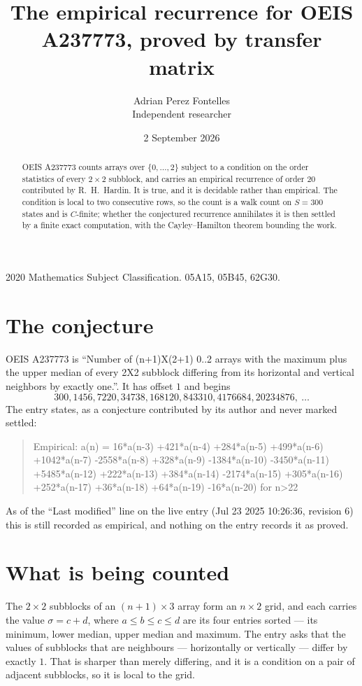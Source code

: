 \documentclass[11pt,a4paper]{article}
\title{The empirical recurrence for OEIS A237773, proved by transfer matrix}
\author{Adrian Perez Fontelles\\ \small Independent researcher}
\date{2 September 2026}
\theoremstyle{plain}
\theoremstyle{definition}
\begin{document}
\maketitle

\begin{abstract}
OEIS A237773 counts arrays over $\{0,\dots,2\}$ subject to a condition on the order
statistics of every $2\times2$ subblock, and carries an empirical recurrence of order
$20$ contributed by R.~H.~Hardin. It is true, and it is decidable rather than empirical.
The condition is local to two consecutive rows, so the count is a walk count on $S=300$
states and is $C$-finite; whether the conjectured recurrence annihilates it is then settled by
a finite exact computation, with the Cayley--Hamilton theorem bounding the work.
\end{abstract}

\noindent\small 2020 Mathematics Subject Classification. 05A15, 05B45, 62G30.\normalsize

\section{The conjecture}

OEIS A237773 is ``Number of (n+1)X(2+1) 0..2 arrays with the maximum plus the upper median of every 2X2 subblock differing from its horizontal and vertical neighbors by exactly one.''. It has offset $1$ and begins
\[
300, 1456, 7220, 34738, 168120, 843310, 4176684, 20234876,\ \dots
\]
The entry states, as a conjecture contributed by its author and never marked settled:
\begin{quote}
Empirical: a(n) = 16*a(n-3) +421*a(n-4) +284*a(n-5) +499*a(n-6) +1042*a(n-7) -2558*a(n-8) +328*a(n-9) -1384*a(n-10) -3450*a(n-11) +5485*a(n-12) +222*a(n-13) +384*a(n-14) -2174*a(n-15) +305*a(n-16) +252*a(n-17) +36*a(n-18) +64*a(n-19) -16*a(n-20) for n>22
\end{quote}
As of the ``Last modified'' line on the live entry (Jul 23 2025 10:26:36, revision 6) this is still
recorded as empirical, and nothing on the entry records it as proved.

\section{What is being counted}

The $2\times2$ subblocks of an $(n+1)\times3$ array form an
$n\times2$ grid, and each carries the value $\sigma=c+d$, where $a\le b\le c\le d$ are its four entries sorted --- its minimum, lower median, upper median and maximum. The entry asks that the values of
subblocks that are neighbours --- horizontally or vertically --- differ by exactly $1$.
That is sharper than merely differing, and it is a condition on a pair of adjacent subblocks,
so it is local to the grid.
\end{document}

